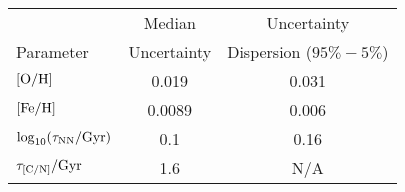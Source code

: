 \begin{tabular}{l|cc}
\hline\hline
 & Median & Uncertainty  \\
Parameter & Uncertainty & Dispersion ($95\% - 5\%$) \\
\hline
${\rm [O/H]}$ & 0.019 & 0.031 \\
${\rm [Fe/H]}$ & 0.0089 & 0.006 \\
$\log_{10}(\tau_{\rm NN}/{\rm Gyr})$ & 0.1 & 0.16 \\
$\tau_{\rm [C/N]}/{\rm Gyr}$ & 1.6 & N/A \\
\hline
\end{tabular}
